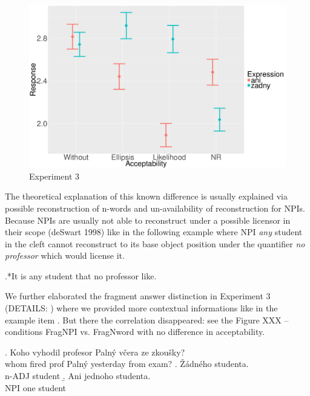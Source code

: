 \documentclass[12pt]{scrartcl}
\begin{document}
\begin{figure}
\centering
\includegraphics{include/mean-sum.png}
\caption{Experiment 3}
\end{figure}

The theoretical explanation of this known difference is usually explained via possible reconstruction of n-words and un-availability of reconstruction for NPIs. Because NPIs are usually not able to reconstruct under a possible licensor in their scope (deSwart 1998) like in the following example where NPI \textit{any} student in the cleft cannot reconstruct to its base object position under the quantifier \textit{no professor} which would license it. 

\ex.*It is any student that no professor like.

We further elaborated the fragment answer distinction in Experiment 3 (DETAILS: ) where we provided more contextual informations like in the example item \Next. But there the correlation disappeared: see the Figure XXX -- conditions FragNPI vs. FragNword with no difference in acceptability.

\ex. Koho vyhodil profesor Palný včera ze zkoušky?\\
whom fired prof Palný yesterday from exam? \a. Žádného studenta.\\
n-ADJ student \b. Ani jednoho studenta.\\
NPI one student
\end{document}
